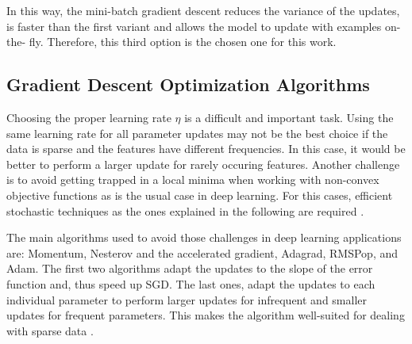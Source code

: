 In this way, the mini-batch gradient descent reduces the variance of the updates, is faster than the first variant and allows the model to update with examples on-the- fly. Therefore, this third option is the chosen one for this work\cite{ruder2016overview}. 

\subsection{Gradient Descent Optimization Algorithms}
Choosing the proper learning rate $\eta$ is a difficult and important task. Using the same learning rate for all parameter updates may not be the best choice if the data is sparse and the features have different frequencies. In this case, it would be better to perform a larger update for rarely occuring features. Another challenge is to avoid getting trapped in a local minima when working with non-convex objective functions as is the usual case in deep learning. For this cases, efficient stochastic techniques as the ones explained in the following are required \cite{ruder2016overview}.

The main algorithms used to avoid those challenges in deep learning applications are: Momentum, Nesterov and the accelerated gradient, Adagrad, RMSPop, and Adam. The first two algorithms adapt the updates to the slope of the error function and, thus speed up SGD. The last ones, adapt the updates to each individual parameter to perform larger updates for infrequent and smaller updates for frequent parameters. This makes the algorithm well-suited for dealing with sparse data \cite{ruder2016overview}.



